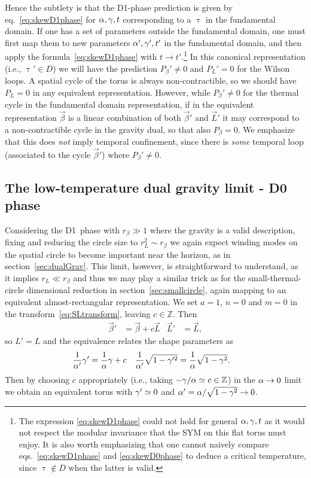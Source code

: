 Hence the subtlety is that the D1-phase prediction is given by eq.~\eqref{eq:skewD1phase} for $\alpha, \gamma, t$ corresponding to a $\uptau$ in the fundamental domain.
If one has a set of parameters outside the fundamental domain, one must first map them to new parameters $\alpha', \gamma', t'$ in the fundamental domain, and then apply the formula~\eqref{eq:skewD1phase} with $t \to t'$.\footnote{The expression \eqref{eq:skewD1phase} could not hold for general $\alpha, \gamma, t$ as it would not respect the modular invariance that the SYM on this flat torus must enjoy.  It is also worth emphasizing that one cannot naively compare eqs.~\eqref{eq:skewD1phase} and \eqref{eq:skewD0phase} to deduce a critical temperature, since $\uptau \not\in D$ when the latter is valid.}
In this canonical representation (i.e., $\uptau' \in D$) we will have the prediction $P_{\beta}' \ne 0$ and $P_L' = 0$ for the Wilson loops.
A spatial cycle of the torus is always non-contractible, so we should have $P_L = 0$ in any equivalent representation.
However, while $P_{\beta}' \ne 0$ for the thermal cycle in the fundamental domain representation, if in the equivalent representation $\vec{\beta}$ is a linear combination of both $\vec{\beta}'$ and $\vec{L}'$ it may correspond to a non-contractible cycle in the gravity dual, so that also $P_{\beta} = 0$.
We emphasize that this does \emph{not} imply temporal confinement, since there is \emph{some} temporal loop (associated to the cycle $\vec{\beta}'$) where $P_{\beta}' \ne 0$.

\subsection{The low-temperature dual gravity limit - D0 phase}
Considering the D1~phase with $r_{\beta} \gg 1$ where the gravity is a valid description, fixing \ga and reducing the circle size to $r_L^2 \sim r_{\beta}$ we again expect winding modes on the spatial circle to become important near the horizon, as in section~\ref{sec:dualGrav}.
This limit, however, is straightforward to understand, as it implies $r_L \ll r_{\beta}$ and thus we may play a similar trick as for the small-thermal-circle dimensional reduction in section~\ref{sec:smallcircle}, again mapping to an equivalent almost-rectangular representation.
We set $a = 1$, $n = 0$ and $m = 0$ in the transform~\eqref{eq:SLtransform}, leaving $c \in \mathbb{Z}$.
Then
\begin{align}
  \vec{\beta}' & = \vec{\beta} + c \vec{L} &
  \vec{L}' & = \vec{L},
\end{align}
so $L' = L$ and the equivalence relates the shape parameters as
\begin{align}
  \label{eq:circred}
  \frac{1}{\alpha'} \gamma' & = \frac{1}{\alpha} \gamma + c &
  \frac{1}{\alpha'} \sqrt{1 - \gamma'^2} & = \frac{1}{\alpha} \sqrt{1 - \gamma^2}.
\end{align}
Then by choosing $c$ appropriately (i.e., taking $-\gamma / \alpha \simeq c \in \mathbb{Z}$) in the $\alpha \to 0$ limit we obtain an equivalent torus with $\gamma' \simeq 0$ and $\alpha' = \alpha / \sqrt{1 - \gamma^2} \to 0$.

